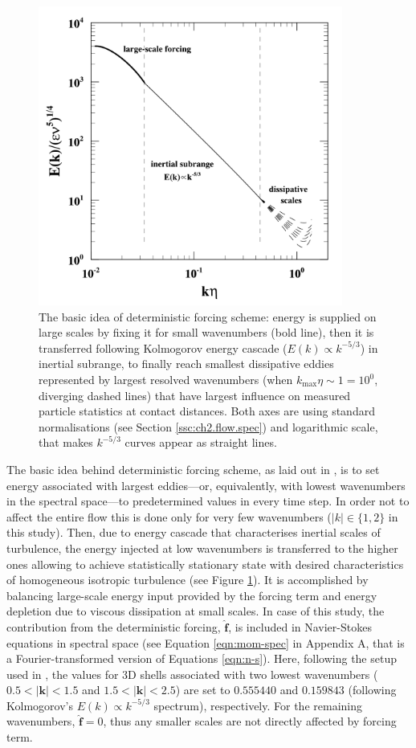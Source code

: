 \documentclass{pracamgren}
\begin{document}
\begin{figure}[ht]
\centering
\includegraphics[width=10cm]{figures/1-01_forcing.pdf}
\caption{
The basic idea of deterministic forcing scheme: energy is supplied on large scales by fixing it for small wavenumbers (bold line), then it is transferred following Kolmogorov energy cascade ($E(k) \propto k^{-5/3}$) in inertial subrange, to finally reach smallest dissipative eddies represented by largest resolved wavenumbers (when $k_{\max} \eta \sim 1 = 10^0$, diverging dashed lines) that have largest influence on measured particle statistics at contact distances.
Both axes are using standard normalisations (see Section \ref{ssc:ch2.flow.spec}) and logarithmic scale, that makes $k^{-5/3}$ curves appear as straight lines.}
\label{fig:forcing}
\end{figure}

The basic idea behind deterministic forcing scheme, as laid out in \textcite{Sullivan1994}, is to set energy associated with largest eddies---or, equivalently, with lowest wavenumbers in the spectral space---to predetermined values in every time step.
In order not to affect the entire flow this is done only for very few wavenumbers ($|k| \in \{ 1, 2 \}$ in this study).
Then, due to energy cascade that characterises inertial scales of turbulence, the energy injected at low wavenumbers is transferred to the higher ones allowing to achieve statistically stationary state with desired characteristics of homogeneous isotropic turbulence (see Figure \ref{fig:forcing}).
It is accomplished by balancing large-scale energy input provided by the forcing term and energy depletion due to viscous dissipation at small scales. 
In case of this study, the contribution from the deterministic forcing, $\hat{\mathbf{f}}$, is included in Navier-Stokes equations in spectral space (see Equation \ref{eqn:mom-spec} in Appendix A, that is a Fourier-transformed version of Equations \ref{eqn:n-s}).
Here, following the setup used in \textcite[p. 6]{Rosa2011}, the values for 3D shells associated with two lowest wavenumbers ($0.5 < |\textbf{k}| < 1.5$ and $1.5 < |\textbf{k}| < 2.5$) are set to $0.555440$ and $0.159843$ (following Kolmogorov's $E(k) \propto k^{-5/3}$ spectrum), respectively.
For the remaining wavenumbers, $\hat{\mathbf{f}} = 0$, thus any smaller scales are not directly affected by forcing term.
\end{document}

